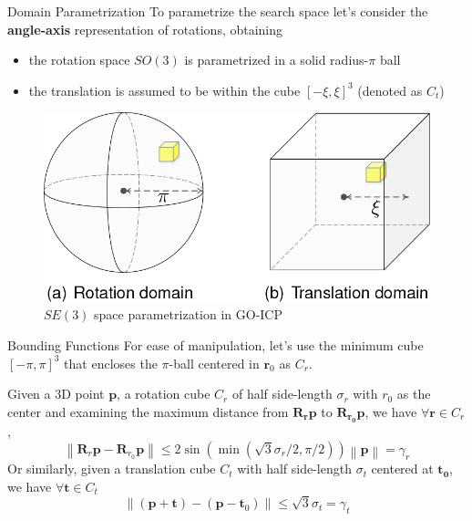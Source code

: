 \documentclass[aspectratio=1610]{beamer}
\newcommand{\norm}[1]{\left\lVert#1\right\rVert}
\begin{document}
\begin{frame}[allowframebreaks]{Domain Parametrization}
To parametrize the search space let's consider the \textbf{angle-axis} representation of rotations, obtaining
\begin{itemize}
	\item the rotation space $SO(3)$ is parametrized in a solid radius-$\pi$ ball 
	\item the translation is assumed to be within the cube $[-\xi,\xi]^3$ (denoted as $C_t$)
\end{itemize}
\begin{figure}[htbp]
\begin{center}
\includegraphics[width=\textwidth,height=0.3\textheight,keepaspectratio]{imgs/GOICP_parametrization.png}
\caption{$SE(3)$ space parametrization in GO-ICP}
\label{default}
\end{center}
\end{figure}
\end{frame}

\begin{frame}[allowframebreaks]{Bounding Functions}
For ease of manipulation, let's use the minimum cube $[−\pi,\pi]^3$ that encloses the $\pi$-ball centered in $\bm{r}_0$ as $C_r$.

\begin{theorem}
Given a 3D point $\bm{p}$, a rotation cube $C_r$ of half side-length $\sigma_r$ with $r_0$ as the center and examining the maximum distance from $\bm{R}_{\bm{r}}\bm{p}$ to $\bm{R}_{\bm{r_0}}\bm{p}$, we have $\forall\bm{r}\in C_r$,
\[ \norm{\bm{R}_r\bm{p}-\bm{R}_{r_0}\bm{p}} \leq 2\sin(\min(\sqrt{3}\sigma_r/2,\pi/2))\norm{\bm{p}} = \gamma_r \]
Or similarly, given a translation cube $C_t$ with half side-length $\sigma_t$ centered at $\bm{t_0}$, we have $\forall\bm{t}\in C_t$
\[ \norm{(\bm{p}+\bm{t}) - (\bm{p}-\bm{t}_0)} \leq \sqrt{3}\sigma_t = \gamma_t \]
\end{theorem}
\end{frame}
\end{document}
